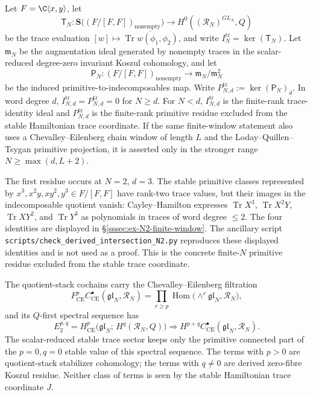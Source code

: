 \documentclass[11pt]{memoir}
\begin{document}
\begin{prop}
\label{prop:finite-N-leftover-residue}
  Let
  \(F=\C\langle x,y\rangle\), let
  \[
    \mathsf T_N\colon
    \mathbf S\bigl((F/[F,F])_{\mathrm{nonempty}}\bigr)
    \longrightarrow
    H^0((\mathcal R_N)^{GL_N},Q)
  \]
  be the trace evaluation
  \([w]\mapsto \overline{\operatorname{Tr}w(\phi_1,\phi_2)}\), and
  write \(I_N^{\mathrm{tr}}=\ker(\mathsf T_N)\).  Let
  \(\mathfrak m_N\) be the augmentation ideal generated by nonempty
  traces in the scalar-reduced degree-zero invariant Koszul cohomology,
  and let
  \[
    \mathsf P_N\colon
    (F/[F,F])_{\mathrm{nonempty}}
    \longrightarrow
    \mathfrak m_N/\mathfrak m_N^2
  \]
  be the induced primitive-to-indecomposables map.  Write
  \(P^{\mathrm{tr}}_{N,d}:=\ker(\mathsf P_N)_d\).  In word degree
  \(d\), \(I^{\mathrm{tr}}_{N,d}=P^{\mathrm{tr}}_{N,d}=0\) for
  \(N\ge d\).  For \(N<d\), \(I^{\mathrm{tr}}_{N,d}\) is the
  finite-rank trace-identity ideal and \(P^{\mathrm{tr}}_{N,d}\) is the
  finite-rank primitive residue excluded from the stable Hamiltonian
  trace coordinate.  If the same finite-window statement also uses a
  Chevalley--Eilenberg chain window of length \(L\) and the
  Loday--Quillen--Tsygan primitive projection, it is asserted only in
  the stronger range \(N\ge\max(d,L+2)\).

  The first residue occurs at \(N=2\), \(d=3\).  The stable primitive
  classes represented by \(x^3,x^2y,xy^2,y^3\in F/[F,F]\) have
  rank-two trace values, but their images in the indecomposable quotient
  vanish: Cayley--Hamilton expresses
  \(\operatorname{Tr}X^3\), \(\operatorname{Tr}X^2Y\),
  \(\operatorname{Tr}XY^2\), and \(\operatorname{Tr}Y^3\) as polynomials
  in traces of word degree \(\le2\).  The four identities are displayed
  in \S\ref{sssec:ex-N2-finite-window}.  The ancillary script
  \texttt{scripts/check\_derived\_intersection\_N2.py} reproduces these
  displayed identities and is not used as a proof.  This is the
  concrete finite-\(N\) primitive residue excluded from the stable trace
  coordinate.

  The quotient-stack cochains carry the Chevalley--Eilenberg
  filtration
  \[
    F^p_{\mathrm{CE}}C^\bullet_{\mathrm{CE}}(\mathfrak{gl}_N,\mathcal R_N)
    =
    \prod_{r\ge p}
    \operatorname{Hom}\bigl(\wedge^r\mathfrak{gl}_N,\mathcal R_N\bigr),
  \]
  and its \(Q\)-first spectral sequence has
  \[
    E_2^{p,q}
    =
    H^p_{\mathrm{CE}}\bigl(\mathfrak{gl}_N;\,
      H^q(\mathcal R_N,Q)\bigr)
    \Longrightarrow
    H^{p+q}C^\bullet_{\mathrm{CE}}(\mathfrak{gl}_N,\mathcal R_N).
  \]
  The scalar-reduced stable trace sector keeps only the primitive
  connected part of the \(p=0,q=0\) stable value of this spectral
  sequence.  The terms with \(p>0\) are quotient-stack stabilizer
  cohomology; the terms with \(q\ne0\) are derived zero-fibre Koszul
  residue.  Neither class of terms is seen by the stable Hamiltonian
  trace coordinate \(J\).


\end{prop}
\end{document}
